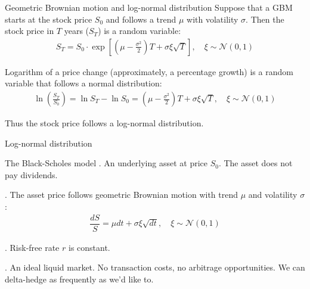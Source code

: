\documentclass{beamer}
\begin{document}
\begin{frame}{Geometric Brownian motion and log-normal distribution}
\justify
Suppose that a GBM starts at the stock price $S_0$ and follows a trend $\mu$ with volatility $\sigma$. Then the stock price in $T$ years ($S_T$) is a random variable:
\begin{align*}
S_T = S_0\cdot \exp\left[\left(\mu - \frac{\sigma^2}{2}\right)T + \sigma\xi\sqrt{T}\right], \quad \xi \sim \mathcal{N}(0, 1)
\end{align*} 

\justify
Logarithm of a price change (approximately, a percentage growth) is a random variable that follows a normal distribution:
\begin{align*}
\ln\left(\frac{S_T}{S_0}\right) = \ln S_T - \ln S_0 = \left(\mu - \frac{\sigma^2}{2}\right)T + \sigma\xi\sqrt{T}, \quad \xi \sim \mathcal{N}(0, 1)
\end{align*}

\justify
Thus the stock price follows a log-normal distribution.
\end{frame}



\begin{frame}{Log-normal distribution}
\centering
{}
\end{frame}



\begin{frame}{The Black-Scholes model}
. An underlying asset at price $S_0$. The asset does not pay dividends.

. The asset price follows geometric Brownian motion with trend $\mu$ and volatility $\sigma$:
\begin{align*}
\dfrac{dS}{S} = \mu dt + \sigma\xi\sqrt{dt}, \quad \xi \sim \mathcal{N}(0,1)
\end{align*}

. Risk-free rate $r$ is constant.

. An ideal liquid market. No transaction costs, no arbitrage opportunities. We can delta-hedge as frequently as we'd like to.
\end{frame}
\end{document}
